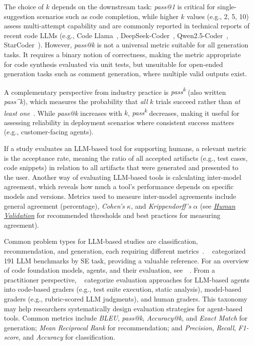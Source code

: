 \documentclass[smallextended]{svjour3}
\newcommand{\humanvalidation}{\hyperref[sec:use-human-validation-for-llm-outputs]{\emph{Human Validation}}\xspace}
\newcommand{\humanvalidation}{\href{/guidelines\#use-human-validation-for-llm-outputs}{\emph{Human Validation}}\xspace}
\begin{document}
The choice of $k$ depends on the downstream task: \emph{pass@1} is critical for single-suggestion scenarios such as code completion, while higher $k$ values (e.g., 2, 5, 10) assess multi-attempt capability and are commonly reported in technical reports of recent code LLMs (e.g., Code Llama~\cite{DBLP:journals/corr/abs-2308-12950}, DeepSeek-Coder~\cite{DBLP:journals/corr/abs-2401-14196}, Qwen2.5-Coder~\cite{DBLP:journals/corr/abs-2409-12186}, StarCoder~\cite{DBLP:journals/tmlr/LiAZMKMMALCLZZW23}).
However, \emph{pass@k} is not a universal metric suitable for all generation tasks.
It requires a binary notion of correctness, making the metric appropriate for code synthesis evaluated via unit tests, but unsuitable for open-ended generation tasks such as comment generation, where multiple valid outputs exist.

A complementary perspective from industry practice is \emph{pass\textsuperscript{k}} (also written \emph{pass\^{}k}), which measures the probability that \emph{all} $k$ trials succeed rather than \emph{at least one}~\cite{Anthropic2025evals}. While \emph{pass@k} increases with $k$, \emph{pass\textsuperscript{k}} decreases, making it useful for assessing reliability in deployment scenarios where consistent success matters (e.g., customer-facing agents).

If a study evaluates an LLM-based tool for supporting humans, a relevant metric is the acceptance rate, meaning the ratio of all accepted artifacts (e.g., test cases, code snippets) in relation to all artifacts that were generated and presented to the user.
Another way of evaluating LLM-based tools is calculating inter-model agreement, which reveals how much a tool's performance depends on specific models and versions.
Metrics used to measure inter-model agreements include general agreement (percentage), \emph{Cohen's} $\kappa$, and \emph{Krippendorff's} $\alpha$ (see \humanvalidation for recommended thresholds and best practices for measuring agreement).

Common problem types for LLM-based studies are classification, recommendation, and generation, each requiring different metrics~\cite{DBLP:journals/tosem/HouZLYWLLLGW24}. \citeauthor{DBLP:journals/corr/abs-2505-08903}~\cite{DBLP:journals/corr/abs-2505-08903} categorized 191 LLM benchmarks by SE task, providing a valuable reference. For an overview of code foundation models, agents, and their evaluation, see~\citeauthor{yang2025code}~\cite{yang2025code}. From a practitioner perspective, \citeauthor{Anthropic2025evals}~\cite{Anthropic2025evals} categorize evaluation approaches for LLM-based agents into code-based graders (e.g., test suite execution, static analysis), model-based graders (e.g., rubric-scored LLM judgments), and human graders. This taxonomy may help researchers systematically design evaluation strategies for agent-based tools. Common metrics include \emph{BLEU}, \emph{pass@k}, \emph{Accuracy@k}, and \emph{Exact Match} for generation; \emph{Mean Reciprocal Rank} for recommendation; and \emph{Precision}, \emph{Recall}, \emph{F1-score}, and \emph{Accuracy} for classification.
\end{document}
